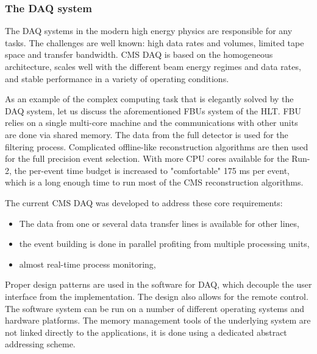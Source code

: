 \begin{normalsize}

\subsubsection{The DAQ system}



The DAQ systems in the modern high energy physics are responsible for any tasks. The challenges are well known: high data rates and volumes, limited tape space and transfer bandwidth. CMS DAQ is based on the homogeneous architecture, scales well with the different beam energy regimes and data rates, and stable  performance  in  a  variety  of  operating  conditions.  

As an example of the complex computing task that is elegantly solved by the DAQ system, let us discuss the aforementioned FBUs system of the HLT. FBU relies on a single multi-core machine and the communications with other units are done via shared memory. The data from the full detector is used for the filtering process. Complicated offline-like reconstruction algorithms are then used for the full precision event selection. With more CPU cores available for the Run-2, the per-event time budget is increased to "comfortable" 175 ms per event, which is a long enough time to run most of the CMS reconstruction algorithms. 

The current CMS DAQ was developed to address these core requirements: 

\begin{itemize}
\item The data from one or several data transfer lines is available for other lines,
\item the event building is done in parallel profiting from multiple processing units,
\item almost real-time process monitoring,
\end{itemize}


Proper design patterns are used in the software for DAQ, which decouple the user  interface from the implementation. The design also allows for the remote control. The  software  system  can be run on a number of different  operating  systems  and  hardware  platforms.   The memory  management  tools  of  the  underlying  system  are not linked directly to the applications, it is done using a dedicated abstract addressing  scheme.

  

\end{normalsize}
